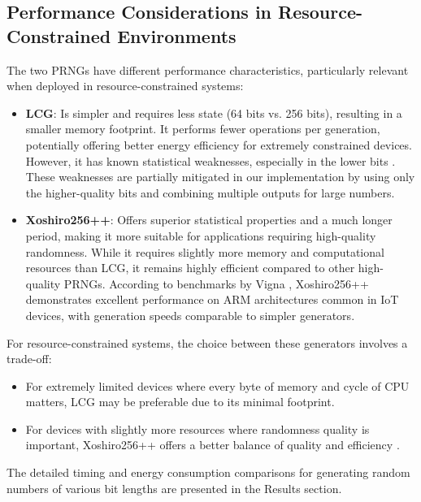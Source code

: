 \subsection{Performance Considerations in Resource-Constrained Environments}

The two PRNGs have different performance characteristics, particularly relevant when deployed in resource-constrained systems:

\begin{itemize}
    \item \textbf{LCG}: Is simpler and requires less state (64 bits vs. 256 bits), resulting in a smaller memory footprint. It performs fewer operations per generation, potentially offering better energy efficiency for extremely constrained devices. However, it has known statistical weaknesses, especially in the lower bits \cite{knuth1997}. These weaknesses are partially mitigated in our implementation by using only the higher-quality bits and combining multiple outputs for large numbers.
    
    \item \textbf{Xoshiro256++}: Offers superior statistical properties and a much longer period, making it more suitable for applications requiring high-quality randomness. While it requires slightly more memory and computational resources than LCG, it remains highly efficient compared to other high-quality PRNGs. According to benchmarks by Vigna \cite{xoshiro_website}, Xoshiro256++ demonstrates excellent performance on ARM architectures common in IoT devices, with generation speeds comparable to simpler generators.
\end{itemize}

For resource-constrained systems, the choice between these generators involves a trade-off:

\begin{itemize}
    \item For extremely limited devices where every byte of memory and cycle of CPU matters, LCG may be preferable due to its minimal footprint.
    
    \item For devices with slightly more resources where randomness quality is important, Xoshiro256++ offers a better balance of quality and efficiency \cite{prng_iot}.
\end{itemize}

The detailed timing and energy consumption comparisons for generating random numbers of various bit lengths are presented in the Results section.

